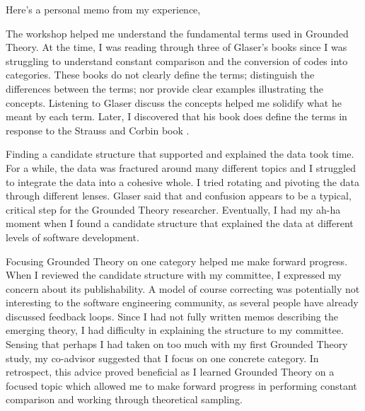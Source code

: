 Here’s a personal memo from my experience, 

The workshop helped me understand the fundamental terms used in Grounded Theory. At the time, I was reading through three of Glaser’s books \cite{GlaserDiscovery, GlaserIssues, GlaserTheoreticalSensitivityLong} since I was struggling to understand constant comparison and the conversion of codes into categories. These books do not clearly define the terms; distinguish the differences between the terms; nor provide clear examples illustrating the concepts. Listening to Glaser discuss the concepts helped me solidify what he meant by each term. Later, I discovered that his book \cite{GlaserBasics} does define the terms in response to the Strauss and Corbin book \cite{Strauss1988Basics}.

Finding a candidate structure that supported and explained the data took time. For a while, the data was fractured around many different topics and I struggled to integrate the data into a cohesive whole. I tried rotating and pivoting the data through different lenses. Glaser said that  \cite{GlaserMillValleyWorkshop} and confusion appears to be a typical, critical step for the Grounded Theory researcher. Eventually, I had my ah-ha moment when I found a candidate structure that explained the data at different levels of software development. 

Focusing Grounded Theory on one category helped me make forward progress. When I reviewed the candidate structure with my committee, I expressed my concern about its publishability. A model of course correcting was potentially not interesting to the software engineering community, as several people have already discussed feedback loops. Since I had not fully written memos describing the emerging theory, I had difficulty in explaining the structure to my committee. Sensing that perhaps I had taken on too much with my first Grounded Theory study, my co-advisor suggested that I focus on one concrete category. In retrospect, this advice proved beneficial as I learned Grounded Theory on a focused topic which allowed me to make forward progress in performing constant comparison and working through theoretical sampling.

